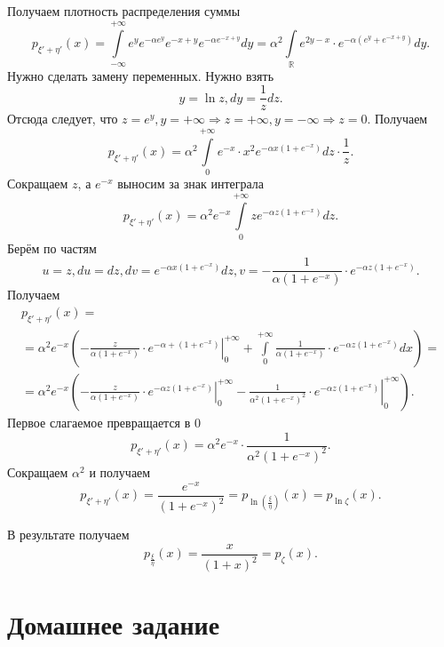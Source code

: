 Получаем плотность распределения суммы
$$p_{ \xi' + \eta'} \left( x \right) =
\int \limits_{- \infty }^{+ \infty } e^y e^{- \alpha e^y} e^{-x+y} e^{- \alpha e^{-x+y}} dy =
\alpha^2 \int \limits_{ \mathbb{R}} e^{2y-x} \cdot e^{- \alpha \left( e^y + e^{-x+y} \right)} dy.$$
Нужно сделать замену переменных.
Нужно взять
$$y = \ln z,
dy = \frac{1}{z}dz.$$
Отсюда следует, что $z = e^y, y = + \infty \Rightarrow z = + \infty, y = - \infty \Rightarrow z = 0$.
Получаем
$$p_{ \xi' + \eta'} \left( x \right) =
\alpha^2 \int \limits_0^{+ \infty } e^{-x} \cdot x^2 e^{- \alpha x \left( 1 + e^{-x} \right) } dz \cdot \frac{1}{z}.$$
Сокращаем $z$, а $e^{-x}$ выносим за знак интеграла
$$p_{ \xi' + \eta'} \left( x \right) =
\alpha^2 e^{-x} \int \limits_0^{+ \infty } ze^{- \alpha z \left( 1 + e^{-x} \right) } dz.$$
Берём по частям
$$u = z,
du = dz,
dv = e^{- \alpha x \left( 1 + e^{-x} \right) } dz,
v = - \frac{1}{ \alpha \left( 1 + e^{-x} \right) } \cdot e^{- \alpha z \left( 1 + e^{-x} \right) }.$$
Получаем
\begin{equation*}
\begin{split}
p_{ \xi' + \eta'} \left( x \right) = \\
= \alpha^2 e^{-x} \left( \left. - \frac{z}{ \alpha \left( 1 + e^{-x} \right) } \cdot e^{- \alpha + \left( 1 + e^{-x} \right) } \right|_0^{+ \infty } +
\int \limits_0^{+ \infty } \frac{1}{ \alpha \left( 1 + e^{-x} \right) } \cdot e^{- \alpha z \left( 1 + e^{-x} \right) } dx \right) = \\
= \alpha^2 e^{-x} \left( \left. - \frac{z}{ \alpha \left( 1 + e^{-x} \right) } \cdot e^{- \alpha z \left( 1 + e^{-x} \right) } \right|_0^{+ \infty } -
\left. \frac{1}{ \alpha^2 \left( 1 + e^{-x} \right)^2 } \cdot e^{- \alpha z \left( 1 + e^{-x} \right)} \right|_0^{+ \infty } \right).
\end{split}
\end{equation*}
Первое слагаемое превращается в 0
$$p_{ \xi' + \eta'} \left( x \right) =
\alpha^2 e^{-x} \cdot \frac{1}{ \alpha^2 \left( 1 + e^{-x} \right) ^2}.$$
Сокращаем $ \alpha^2$ и получаем
$$p_{ \xi' + \eta'} \left( x \right) = \frac{e^{-x}}{ \left( 1 + e^{-x} \right)^2} =
p_{ \ln \left( \frac{ \xi }{ \eta } \right) } \left( x \right) =
p_{ \ln \zeta } \left( x \right).$$

В результате получаем
$$p_{ \frac{ \xi }{ \eta }} \left( x \right) =
\frac{x}{ \left( 1 + x \right)^2} =
p_{ \zeta } \left( x \right).$$

\section*{Домашнее задание}

